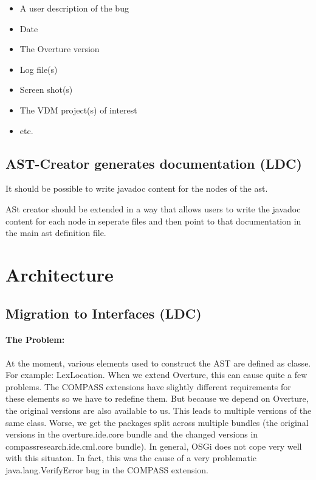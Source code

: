 \documentclass[11pt]{overturerep}
\begin{document}
\begin{itemize} 
    \item A user description of the bug 
    \item Date 
    \item The Overture version 
    \item Log file(s) 
    \item Screen shot(s) 
    \item The VDM project(s) of interest 
    \item etc.  
\end{itemize}




\section{AST-Creator generates documentation (LDC)}

It should be possible to write javadoc content for the nodes of the ast.

ASt creator should be extended in a way that allows users to write the javadoc 
content for each node in seperate files and then point to that documentation in
the main ast definition file.





\chapter{Architecture}


\section{Migration to Interfaces (LDC) } \label{sec:interfacemig}

\subsubsection{The Problem:}

At the moment, various elements used to construct the AST are defined as
classe. For example: \textsf{LexLocation}. When we extend Overture, this
can cause quite a few problems. The COMPASS extensions have slightly
different requirements for these elements so we have to redefine them. But
because we depend on Overture, the original versions are also available to
us. This leads to multiple versions of the same class. Worse, we get the
packages split across multiple bundles (the original versions in the
overture.ide.core bundle and the changed versions in
compassresearch.ide.cml.core bundle). In general, OSGi does not cope very
well with this situaton. In fact, this was the cause of a very problematic
\textsf{java.lang.VerifyError} bug in the COMPASS extension.
\end{document}
